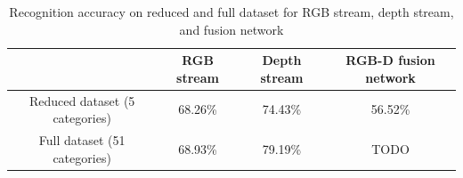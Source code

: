 \begin{table}[htbp]
	\centering
	\caption{Recognition accuracy on reduced and full dataset for RGB stream, depth stream, and fusion network}
	\label{tab:result}
	\begin{tabular}{|c|c|c|c|}
		\hline
		& RGB stream & Depth stream & RGB-D fusion network \\ \hline
		Reduced dataset (5 categories) & 68.26\% & 74.43\% & 56.52\% \\ 
		Full dataset (51 categories) & 68.93\% & 79.19\% & TODO \\ \hline
	\end{tabular} 
\end{table}